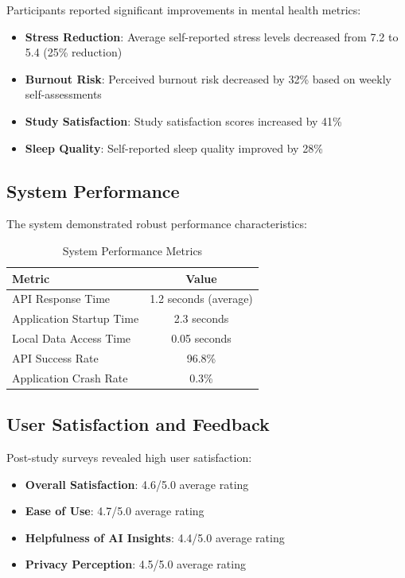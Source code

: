 \documentclass[conference,10pt]{IEEEtran}
\begin{document}
Participants reported significant improvements in mental health metrics:

\begin{itemize}
\item \textbf{Stress Reduction}: Average self-reported stress levels decreased from 7.2 to 5.4 (25\% reduction)
\item \textbf{Burnout Risk}: Perceived burnout risk decreased by 32\% based on weekly self-assessments
\item \textbf{Study Satisfaction}: Study satisfaction scores increased by 41\%
\item \textbf{Sleep Quality}: Self-reported sleep quality improved by 28\%
\end{itemize}

\subsection{System Performance}

The system demonstrated robust performance characteristics:

\begin{table}[h]
\centering
\caption{System Performance Metrics}
\begin{tabular}{lc}
\toprule
\textbf{Metric} & \textbf{Value} \\
\midrule
API Response Time & 1.2 seconds (average) \\
Application Startup Time & 2.3 seconds \\
Local Data Access Time & 0.05 seconds \\
API Success Rate & 96.8\% \\
Application Crash Rate & 0.3\% \\
\bottomrule
\end{tabular}
\end{table}

\subsection{User Satisfaction and Feedback}

Post-study surveys revealed high user satisfaction:

\begin{itemize}
\item \textbf{Overall Satisfaction}: 4.6/5.0 average rating
\item \textbf{Ease of Use}: 4.7/5.0 average rating
\item \textbf{Helpfulness of AI Insights}: 4.4/5.0 average rating
\item \textbf{Privacy Perception}: 4.5/5.0 average rating
\end{itemize}
\end{document}
